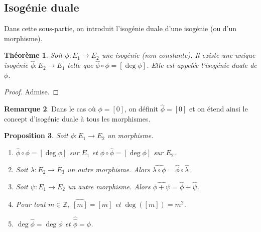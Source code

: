 \documentclass{article}
\theoremstyle{plain}%
\newtheorem{thm}{Théorème}[section]
\newtheorem{prop}[thm]{Proposition}
\theoremstyle{definition}%
\newtheorem{rem}[thm]{Remarque}
\newcommand{\Z}{\mathbb{Z}}
\newcommand{\h}{\widehat}
\begin{document}
\subsection{Isogénie duale}

Dans cette sous-partie, on introduit l'isogénie duale d'une isogénie (ou d'un morphisme).

\begin{thm}
  \label{existence_duale}
  Soit $\phi : E_1\to E_2$ une isogénie (non constante). Il existe une unique isogénie $\h\phi : E_2\to E_1$ telle que $\h\phi \circ \phi = [\deg\phi]$. Elle est appelée l'isogénie duale de $\phi$.
\end{thm}

\begin{proof}
  Admise. 
\end{proof}

\begin{rem}
Dans le cas où $\phi = [0]$, on définit $\h\phi = [0]$ et on étend ainsi le concept d'isogénie duale à tous les morphismes.
\end{rem}

\begin{prop}
  \label{propriétés_duale}
  Soit $\phi : E_1 \to E_2$ un morphisme.  
  \begin{enumerate}
    \item $\h\phi\circ\phi = [\deg{\phi}]$ sur $E_1$ et $\phi\circ\h\phi = [\deg{\phi}]$ sur $E_2$.
    \item Soit $\lambda :E_2\to E_3$ un autre morphisme. Alors $\h{\lambda\circ\phi} = \h\phi\circ\h\lambda$.
    \item Soit $\psi :E_1\to E_2$ un autre morphisme. Alors $\h{\phi+\psi} = \h\phi + \h\psi$.
    \item Pour tout $m\in\Z$, $\h{[m]} = [m]$ et $\deg([m]) = m^2$.
    \item $\deg\h\phi = \deg\phi$ et $\h{\h\phi} = \phi$.
  \end{enumerate}
\end{prop}
\end{document}
